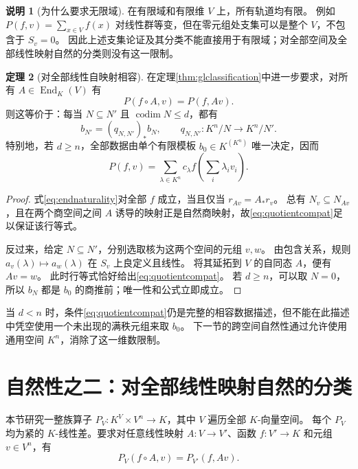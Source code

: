 \documentclass[UTF8,11pt,a4paper]{ctexart}
\theoremstyle{definition}
\newtheorem{theorem}{定理}[section]
\newtheorem{remark}[theorem]{说明}
\newcommand{\End}{\operatorname{End}}
\numberwithin{equation}{section}
\begin{document}
\begin{remark}[为什么要求无限域]
在有限域和有限维 $V$ 上，所有轨道均有限。
例如 $P(f,v)=\sum_{x\in V}f(x)$ 对线性群等变，但在零元组处支集可以是整个 $V$，不包含于 $S_v=0$。
因此上述支集论证及其分类不能直接用于有限域；对全部空间及全部线性映射自然的分类则没有这一限制。
\end{remark}

\begin{theorem}[对全部线性自映射相容]\label{thm:endclassification}
在定理\ref{thm:glclassification}中进一步要求，对所有 $A\in\End_K(V)$ 有
\begin{equation}\label{eq:endnaturality}
 P(f\circ A,v)=P(f,Av).
\end{equation}
则这等价于：每当 $N\subseteq N'$ 且 $\operatorname{codim}N\le d$，都有
\begin{equation}\label{eq:quotientcompat}
 b_{N'}=(q_{N,N'})_*b_N,
 \qquad q_{N,N'}:K^n/N\to K^n/N'.
\end{equation}
特别地，若 $d\ge n$，全部数据由单个有限模板 $b_0\in K^{(K^n)}$ 唯一决定，因而
\[
 P(f,v)=\sum_{\lambda\in K^n}c_\lambda f\left(\sum_i\lambda_iv_i\right).
\]
\end{theorem}
\begin{proof}
式\eqref{eq:endnaturality}对全部 $f$ 成立，当且仅当 $r_{Av}=A_*r_v$。
总有 $N_v\subseteq N_{Av}$，且在两个商空间之间 $A$ 诱导的映射正是自然商映射，故\eqref{eq:quotientcompat}足以保证该行等式。

反过来，给定 $N\subseteq N'$，分别选取核为这两个空间的元组 $v,w$。
由包含关系，规则 $a_v(\lambda)\mapsto a_w(\lambda)$ 在 $S_v$ 上良定义且线性。
将其延拓到 $V$ 的自同态 $A$，便有 $Av=w$。
此时行等式恰好给出\eqref{eq:quotientcompat}。
若 $d\ge n$，可以取 $N=0$，所以 $b_N$ 都是 $b_0$ 的商推前；唯一性和公式立即成立。
\end{proof}

当 $d<n$ 时，条件\eqref{eq:quotientcompat}仍是完整的相容数据描述，但不能在此描述中凭空使用一个未出现的满秩元组来取 $b_0$。
下一节的跨空间自然性通过允许使用通用空间 $K^n$，消除了这一维数限制。

\section{自然性之二：对全部线性映射自然的分类}\label{sec:universal}
本节研究一整族算子 $P_V:K^V\times V^n\to K$，其中 $V$ 遍历全部 $K$-向量空间。
每个 $P_V$ 均为紧的 $K$-线性差。要求对任意线性映射 $A:V\to V'$、函数 $f:V'\to K$ 和元组 $v\in V^n$，有
\begin{equation}\label{eq:functorial}
 P_V(f\circ A,v)=P_{V'}(f,Av).
\end{equation}
\end{document}
